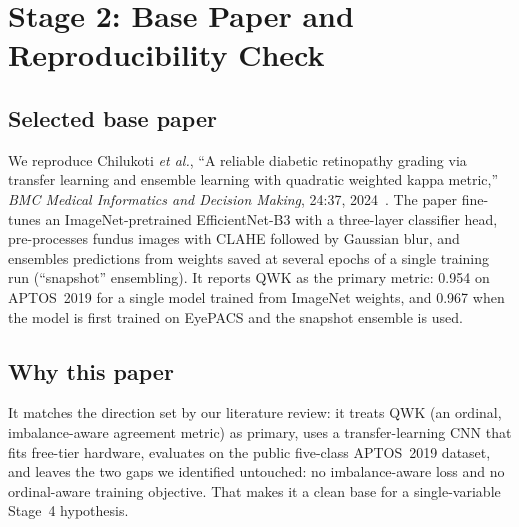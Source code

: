 \section{Stage 2: Base Paper and Reproducibility Check}

\subsection{Selected base paper}
We reproduce Chilukoti \emph{et al.}, ``A reliable diabetic retinopathy grading via transfer learning and
ensemble learning with quadratic weighted kappa metric,'' \emph{BMC Medical Informatics and Decision
Making}, 24:37, 2024~\cite{chilukoti2024}. The paper fine-tunes an ImageNet-pretrained EfficientNet-B3 with a
three-layer classifier head, pre-processes fundus images with CLAHE followed by Gaussian blur, and ensembles
predictions from weights saved at several epochs of a single training run (``snapshot'' ensembling). It reports
QWK as the primary metric: 0.954 on APTOS~2019 for a single model trained from ImageNet weights, and 0.967
when the model is first trained on EyePACS and the snapshot ensemble is used.

\subsection{Why this paper}
It matches the direction set by our literature review: it treats QWK (an ordinal, imbalance-aware agreement
metric) as primary, uses a transfer-learning CNN that fits free-tier hardware, evaluates on the public
five-class APTOS~2019 dataset, and leaves the two gaps we identified untouched: no imbalance-aware loss and
no ordinal-aware training objective. That makes it a clean base for a single-variable Stage~4 hypothesis.

